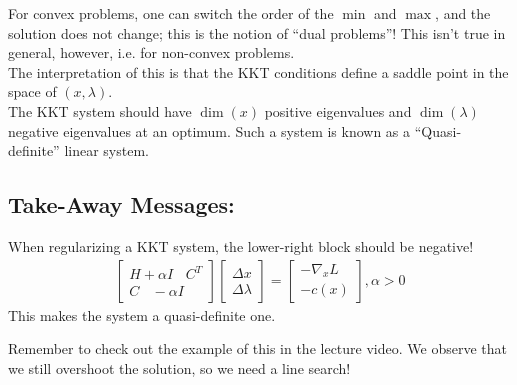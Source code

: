 \noindent
For convex problems, one can switch the order of the $\min$ and $\max$, and the solution does not change; this is the notion of ``dual problems''! This isn't true in general, however, i.e. for non-convex problems. \\

\noindent
The interpretation of this is that the KKT conditions define a saddle point in the space of $(x, \lambda)$. \\

\noindent
The KKT system should have $\dim(x)$ positive eigenvalues and $\dim(\lambda)$ negative eigenvalues at an optimum. Such a system is known as a ``Quasi-definite'' linear system. \\

\subsection{Take-Away Messages:}
\noindent
When regularizing a KKT system, the lower-right block should be negative! 
\begin{align}
    \begin{bmatrix}
        H + \alpha I \ \ \ \ C^T \\
        C \ \ \ \ -\alpha I 
    \end{bmatrix}
    \begin{bmatrix}
        \Delta x \\
        \Delta \lambda
    \end{bmatrix}
    = 
    \begin{bmatrix}
        -\nabla_x L \\
        - c(x)
    \end{bmatrix}
    , 
    \alpha > 0
\end{align}
This makes the system a quasi-definite one.

\noindent
Remember to check out the example of this in the lecture video. We observe that we still overshoot the solution, so we need a line search! 

